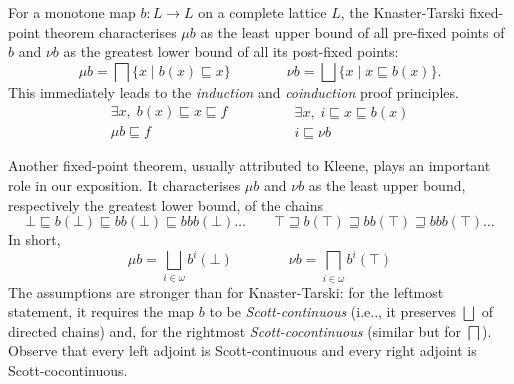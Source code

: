 \documentclass{llncs}
\begin{document}
\medskip

For a monotone map $b\colon L \to L$ on a complete lattice $L$, the Knaster-Tarski fixed-point theorem characterises $\mu b$ as the least upper bound of all pre-fixed points of $b$ and $\nu b$ as the
greatest lower bound of all its post-fixed points:
\begin{equation*}\label{eq:KNfpthm}
\mu b= \bigsqcap \{ x  \mid b(x) \sqsubseteq x \} \qquad \qquad \nu b= \bigsqcup \{ x  \mid x \sqsubseteq b(x) \}\text{.}
\end{equation*} 
%
This immediately leads to the
\emph{induction} and \emph{coinduction} proof principles.
\begin{equation}\label{eq:coinductionproofprinciple}\begin{array}{c}
    \exists x, \;  b(x)\sqsubseteq x \sqsubseteq f\\
    \hline \hline %
    \mu b \sqsubseteq f
\end{array}
\qquad
\qquad
\begin{array}{c}
    \exists x, \; i \sqsubseteq x\sqsubseteq b(x)\\
    \hline \hline %
    i \sqsubseteq \nu b
\end{array}
\end{equation}

Another fixed-point theorem, usually attributed to Kleene, plays an important role in our exposition. It characterises $\mu b$ and $\nu b$ as the least upper bound, respectively the greatest lower bound, of the chains
\begin{equation}\label{eq:initfinsequences}
\bot \sqsubseteq b(\bot) \sqsubseteq bb(\bot) \sqsubseteq bbb(\bot) \dots \qquad  \top \sqsupseteq b(\top) \sqsupseteq bb(\top)  \sqsupseteq bbb(\top) \dots 
\end{equation}
In short, 
\begin{equation*}\label{eq:Kleenefpthm}
\mu b = \bigsqcup_{i\in \omega} b^i(\bot) \qquad \qquad \nu b = \bigsqcap_{i\in \omega} b^i(\top)
\end{equation*}
The assumptions are stronger than for Knaster-Tarski: for the leftmost statement, it requires the map $b$ to be \emph{Scott-continuous} (i.e.., it preserves $\bigsqcup$ of directed chains) and, for the rightmost  \emph{Scott-cocontinuous} (similar but for  $\bigsqcap$). Observe that every left adjoint is Scott-continuous and every right adjoint is Scott-cocontinuous.
%
\end{document}
